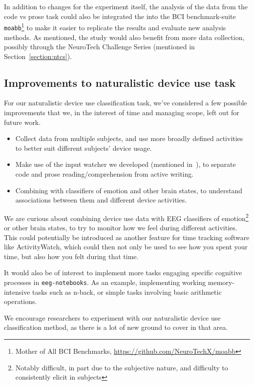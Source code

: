 In addition to changes for the experiment itself, the analysis of the data from the code vs prose task could also be integrated the into the BCI benchmark-suite \texttt{moabb}\footnote{Mother of All BCI Benchmarks, \url{https://github.com/NeuroTechX/moabb}} to make it easier to replicate the results and evaluate new analysis methods. As mentioned, the study would also benefit from more data collection, possibly through the NeuroTech Challenge Series (mentioned in Section~\ref{section:ntcs}).

\subsection{Improvements to naturalistic device use task}

For our naturalistic device use classification task, we've considered a few possible improvements that we, in the interest of time and managing scope, left out for future work. 

\begin{itemize}
    \item Collect data from multiple subjects, and use more broadly defined activities to better suit different subjects' device usage.
    \item Make use of the input watcher we developed (mentioned in~), to separate code and prose reading/comprehension from active writing.
    \item Combining with classifiers of emotion and other brain states, to understand associations between them and different device activities.
\end{itemize}

We are curious about combining device use data with EEG classifiers of emotion\footnote{Notably difficult, in part due to the subjective nature, and difficulty to consistently elicit in subjects} or other brain states, to try to monitor how we feel during different activities. This could potentially be introduced as another feature for time tracking software like ActivityWatch, which could then not only be used to see how you spent your time, but also how you felt during that time.

It would also be of interest to implement more tasks engaging specific cognitive processes in \texttt{eeg-notebooks}. As an example, implementing working memory-intensive tasks such as n-back, or simple tasks involving basic arithmetic operations.

We encourage researchers to experiment with our naturalistic device use classification method, as there is a lot of new ground to cover in that area.

